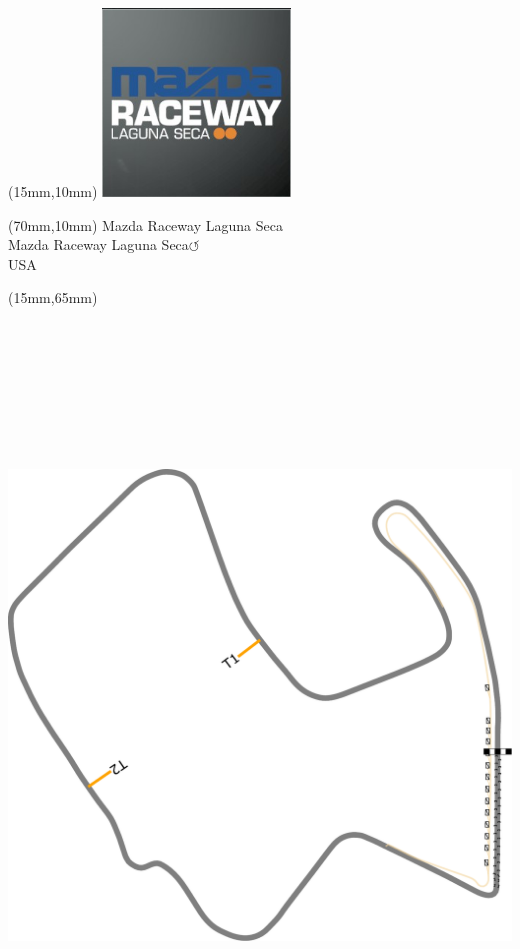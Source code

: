 \null\newpage
\begin{textblock*}{50mm}(15mm,10mm)%
\includegraphics[width=50mm]{LG/2015-05-20_00085.png}
\end{textblock*}
\begin{textblock*}{130mm}(70mm,10mm)%
{\fontsize{20}{20}\selectfont Mazda Raceway Laguna Seca\\}
{\fontsize{16}{16}\selectfont Mazda Raceway Laguna Seca\hfill \huge$\circlearrowleft$\\}
{\fontsize{12}{12}\selectfont USA\\}
\end{textblock*}
\begin{textblock*}{185mm}(15mm,65mm)%
\centering
\mbox{\includegraphics[width=185mm,height=210mm,keepaspectratio]{PT/MRLASE.pdf}}
\end{textblock*}
